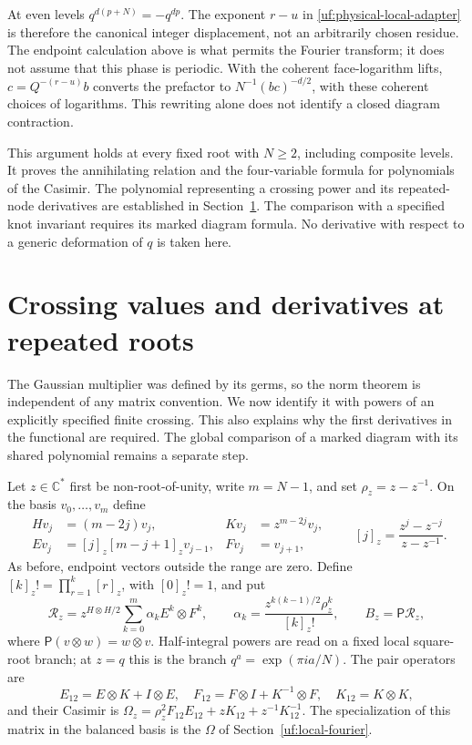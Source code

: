 \documentclass[11pt]{article}
\numberwithin{equation}{section}
\theoremstyle{definition}\newtheorem{definition}[theorem]{Definition}
\theoremstyle{remark}\newtheorem{remark}[theorem]{Remark}
\begin{document}
At even levels \(q^{d(p+N)}=-q^{dp}\). The exponent \(r-u\)
in \eqref{uf:physical-local-adapter} is therefore the canonical
integer displacement, not an arbitrarily chosen residue. The
endpoint calculation above is what permits the Fourier transform;
it does not assume that this phase is periodic. With the coherent
face-logarithm lifts, \(c=Q^{-(r-u)}b\) converts the prefactor to
\(N^{-1}(bc)^{-d/2}\), with these coherent choices of logarithms. This rewriting alone
does not identify a closed diagram contraction.

This argument holds at every fixed root with \(N\ge2\), including
composite levels. It proves the annihilating relation and the four-variable formula for
polynomials of the Casimir. The polynomial representing a crossing power and its repeated-node
derivatives are established in Section~\ref{fb:crossing}. The
comparison with a specified knot invariant requires its marked
diagram formula. No derivative
with respect to a generic deformation of \(q\) is taken here.

\section{Crossing values and derivatives at repeated roots}
\label{fb:crossing}

The Gaussian multiplier was defined by its germs, so the norm theorem
is independent of any matrix convention. We now identify it with powers
of an explicitly specified finite crossing. This also explains why the
first derivatives in the functional are required. The global comparison
of a marked diagram with its shared polynomial remains a separate step.

Let $z\in\mathbb C^*$ first be non-root-of-unity, write $m=N-1$, and set
$\rho_z=z-z^{-1}$. On the basis $v_0,\ldots,v_m$ define
\[
\begin{aligned}
 Hv_j&=(m-2j)v_j,& Kv_j&=z^{m-2j}v_j,\\
 Ev_j&=[j]_z[m-j+1]_zv_{j-1},& Fv_j&=v_{j+1},
\end{aligned}
\qquad [j]_z=\frac{z^j-z^{-j}}{z-z^{-1}}.
\]
As before, endpoint vectors outside the range are zero. Define
$[k]_z!=\prod_{r=1}^k[r]_z$, with $[0]_z!=1$, and put
\[
 \mathscr R_z=z^{H\otimes H/2}
       \sum_{k=0}^{m}\alpha_k E^k\otimes F^k,
 \qquad
 \alpha_k=\frac{z^{k(k-1)/2}\rho_z^k}{[k]_z!},
 \qquad B_z=\mathsf P\mathscr R_z,
\]
where $\mathsf P(v\otimes w)=w\otimes v$. Half-integral powers are
read on a fixed local square-root branch; at $z=q$ this is the branch
$q^a=\exp(\pi ia/N)$. The pair operators are
\[
 E_{12}=E\otimes K+I\otimes E,\quad
 F_{12}=F\otimes I+K^{-1}\otimes F,\quad K_{12}=K\otimes K,
\]
and their Casimir is
$\Omega_z=\rho_z^2F_{12}E_{12}+zK_{12}+z^{-1}K_{12}^{-1}$.
The specialization of this matrix in the balanced basis is the $\Omega$
of Section~\ref{uf:local-fourier}.
\end{document}
